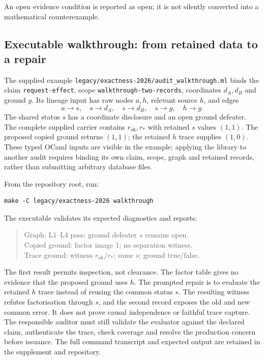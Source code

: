 \documentclass[twocolumn,envcountsect,envcountsame,natbib]{svjour3}
\newcommand{\code}[1]{\texttt{#1}}
\begin{document}
An open evidence condition is reported as open; it is not silently converted into a mathematical counterexample.

\subsection{Executable walkthrough: from retained data to a repair}\label{ex:sec:walkthrough}
The supplied example \nolinkurl{legacy/exactness-2026/audit_walkthrough.ml} binds the claim \code{request-effect}, scope \code{walkthrough-two-records}, coordinates $d_A,d_B$ and ground $g$. Its lineage input has raw nodes $a,h$, relevant source $h$, and edges
\[
a\to s,\quad s\to d_A,\quad s\to d_B,
\quad s\to g,\quad h\to g.
\]
The shared status $s$ has a coordinate disclosure and an open ground defeater. The complete supplied carrier contains $r_{\mathrm{ok}},r_*$ with retained $s$ values $(1,1)$. The proposed copied ground returns $(1,1)$; the retained $h$ trace supplies $(1,0)$. These typed OCaml inputs are visible in the example; applying the library to another audit requires binding its own claim, scope, graph and retained records, rather than submitting arbitrary database files.

From the repository root, run:
\begin{verbatim}
make -C legacy/exactness-2026 walkthrough
\end{verbatim}
The executable validates its expected diagnostics and reports:
\begin{quote}\small
Graph: L1--L4 pass; ground defeater $s$ remains open.\\
Copied ground: factor image 1; no separation witness.\\
Trace ground: witness $r_{\mathrm{ok}}/r_*$; same $s$; ground true/false.
\end{quote}
The first result permits inspection, not clearance. The factor table gives no evidence that the proposed ground uses $h$. The prompted repair is to evaluate the retained $h$ trace instead of reusing the common status $s$. The resulting witness refutes factorisation through $s$, and the second record exposes the old and new common error. It does not prove causal independence or faithful trace capture. The responsible auditor must still validate the evaluator against the declared claim, authenticate the trace, check coverage and resolve the production concern before issuance. The full command transcript and expected output are retained in the supplement and repository.
\end{document}
